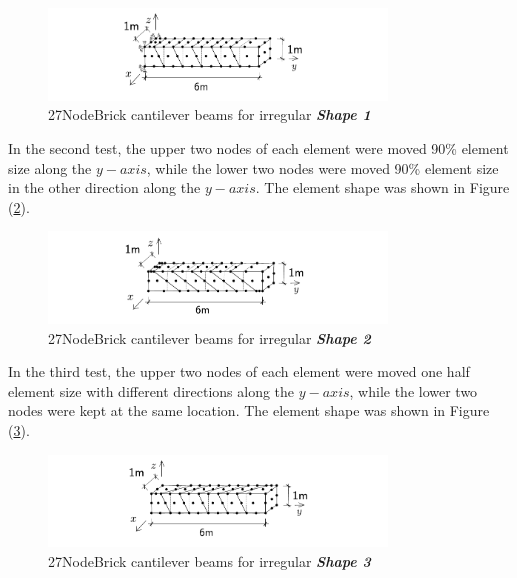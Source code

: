 \documentclass[fleqn,11pt]{article}
\begin{document}
\begin{figure}[H]
  \centering
  \includegraphics[width=9cm]{../Figure-files/beam_brick27_shape1.pdf}
  \caption{27NodeBrick cantilever beams for irregular \textbf{\emph{Shape 1}} }
  \label{fig irregular shape 1 27NodeBrick cantilever beams }
\end{figure}


In the second test, the upper two nodes of each element were moved 90\% element size along the $y-axis$, while the lower two nodes were moved 90\% element size in the other direction along the $y-axis$. The element shape was shown in Figure (\ref{fig irregular shape 2 27NodeBrick cantilever beams }).

\begin{figure}[H]
  \centering
  \includegraphics[width=9cm]{../Figure-files/beam_brick27_shape2.pdf}
  \caption{27NodeBrick cantilever beams for irregular \textbf{\emph{Shape 2}} }
  \label{fig irregular shape 2 27NodeBrick cantilever beams }
\end{figure}



In the third test, the upper two nodes of each element were moved one half element size with different directions along the $y-axis$, while the lower two nodes were kept at the same location. The element shape was shown in Figure (\ref{fig irregular shape 3 27NodeBrick cantilever beams }).

\begin{figure}[H]
  \centering
  \includegraphics[width=9cm]{../Figure-files/beam_brick27_shape3.pdf}
  \caption{27NodeBrick cantilever beams for irregular \textbf{\emph{Shape 3}} }
  \label{fig irregular shape 3 27NodeBrick cantilever beams }
\end{figure}
\end{document}
